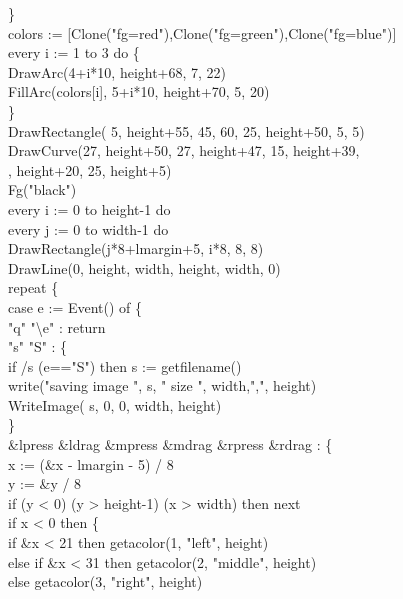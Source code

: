 {\>\>\} \\
\>colors := [Clone("fg=red"),Clone("fg=green"),Clone("fg=blue")] \\
\>every i := 1 to 3 do \{ \\
\>\>DrawArc(4+i*10, height+68, 7, 22) \\
\>\>FillArc(colors[i], 5+i*10, height+70, 5, 20) \\
\>\>\} \\
\>DrawRectangle( 5, height+55, 45, 60, 25, height+50, 5, 5) \\
\>DrawCurve(27, height+50, 27, height+47, 15, height+39, \\
\>, height+20, 25, height+5) \\
\>Fg("black") \\
\>every i := 0 to height-1 do \\
\>\>every j := 0 to width-1 do \\
\>\>\>DrawRectangle(j*8+lmargin+5, i*8, 8, 8) \\
\>DrawLine(0, height, width, height, width, 0) \\
\>repeat \{ \\
\>\>case e := Event() of \{ \\
\>\>\>"q" {\textbar} "{\textbackslash}e" : return \\
\>\>\>"s" {\textbar} "S" : \{ \\
\>\>\>\>if /s {\textbar} (e=="S") then s := getfilename() \\
\>\>\>\>write("saving image ", s, " size ", width,",", height) \\
\>\>\>\>WriteImage( s, 0, 0, width, height) \\
\>\>\>\>\} \\
\>\>\>\&lpress {\textbar} \&ldrag {\textbar} \&mpress {\textbar}
\&mdrag {\textbar} \&rpress {\textbar} \&rdrag : \{ \\
\>\>\>\>x := (\&x - lmargin - 5) / 8 \\
\>\>\>\>y := \&y / 8 \\
\>\>\>\>if (y {\textless} 0) {\textbar} (y {\textgreater}
height-1) {\textbar} (x {\textgreater} width) then next \\
\>\>\>\>if x {\textless} 0 then \{ \\
\>\>\>\>\>if \&x {\textless} 21 then getacolor(1, "left", height) \\
\>\>\>\>\>else if \&x {\textless} 31 then getacolor(2, "middle", height) \\
\>\>\>\>\>else getacolor(3, "right", height) \\
}
